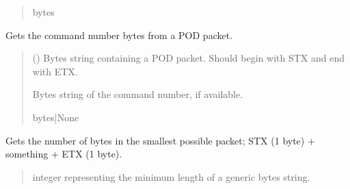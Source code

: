 \documentclass[letterpaper,10pt,english]{sphinxmanual}
\begin{document}
\begin{fulllineitems}
\begin{fulllineitems}
\begin{quote}
\begin{description}
\sphinxAtStartPar
bytes

\end{description}\end{quote}

\end{fulllineitems}


\begin{fulllineitems}
\label{\detokenize{Morelia.Packets:Morelia.Packets.Packet.Packet.GetCommandNumber}}
\pysigstartsignatures
{}
\pysigstopsignatures
\sphinxAtStartPar
Gets the command number bytes from a POD packet.
\begin{quote}\begin{description}
\sphinxAtStartPar
{} () \textendash{} Bytes string containing a POD packet. Should begin with STX and                 end with ETX.

\sphinxAtStartPar
Bytes string of the command number, if available.

\sphinxAtStartPar
bytes|None

\end{description}\end{quote}

\end{fulllineitems}


\begin{fulllineitems}
\label{\detokenize{Morelia.Packets:Morelia.Packets.Packet.Packet.GetMinimumLength}}
\pysigstartsignatures
{}
\pysigstopsignatures
\sphinxAtStartPar
Gets the number of bytes in the smallest possible packet; STX (1 byte) +         something + ETX (1 byte).
\begin{quote}\begin{description}
\sphinxAtStartPar
integer representing the minimum length of a generic bytes string.


\end{description}
\end{quote}
\end{fulllineitems}
\end{fulllineitems}
\end{document}
